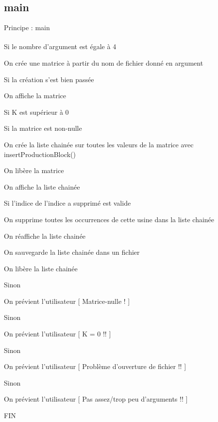 \documentclass[a4paper]{article}
\newcommand\tab[1][1cm]{\hspace*{#1}}
\begin{document}
\subsection{main}
\begin{algorithm}
Principe : main
\\
\\
\tab Si le nombre d'argument est égale à 4 

\tab \tab On crée une matrice à partir du nom de fichier donné en argument 

\tab \tab Si la création s'est bien passée 

\tab \tab \tab On affiche la matrice 

\tab \tab \tab Si K est supérieur à 0 

\tab \tab \tab \tab Si la matrice est non-nulle 

\tab \tab \tab \tab \tab On crée la liste chainée sur toutes les valeurs de la matrice avec 
\tab \tab \tab \tab \tab insertProductionBlock() 

\tab \tab \tab \tab \tab On libère la matrice 

\tab \tab \tab \tab \tab On affiche la liste chainée 

\tab \tab \tab \tab \tab Si l'indice de l'indice a supprimé est valide 

\tab \tab \tab \tab \tab \tab On supprime toutes les occurrences de cette usine dans la liste chainée 

\tab \tab \tab \tab \tab On réaffiche la liste chainée 

\tab \tab \tab \tab \tab On sauvegarde la liste chainée dans un fichier 

\tab \tab \tab \tab \tab On libère la liste chainée 

\tab \tab \tab \tab Sinon 

\tab \tab \tab \tab \tab On prévient l'utilisateur [ Matrice-nulle ! ] 

\tab \tab \tab Sinon 

\tab \tab \tab \tab On prévient l'utilisateur [ K = 0  !! ] 

\tab \tab Sinon  

\tab \tab \tab On prévient l'utilisateur [ Problème d'ouverture de fichier !! ] 

\tab Sinon 

\tab On prévient l'utilisateur [ Pas assez/trop peu d'arguments !! ] 

FIN
\end{algorithm}
\end{document}

